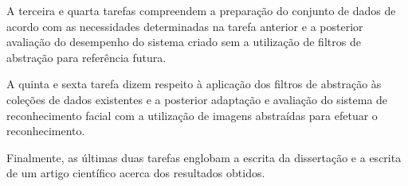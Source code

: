 A terceira e quarta tarefas compreendem a preparação do conjunto de dados de acordo com as necessidades determinadas na tarefa anterior e a posterior avaliação do desempenho do sistema criado sem a utilização de filtros de abstração para referência futura.

A quinta e sexta tarefa dizem respeito à aplicação dos filtros de abstração às coleções de dados existentes e a posterior adaptação e avaliação do sistema de reconhecimento facial com a utilização de imagens abstraídas para efetuar o reconhecimento.

Finalmente, as últimas duas tarefas englobam a escrita da dissertação e a escrita de um artigo científico acerca dos resultados obtidos.
